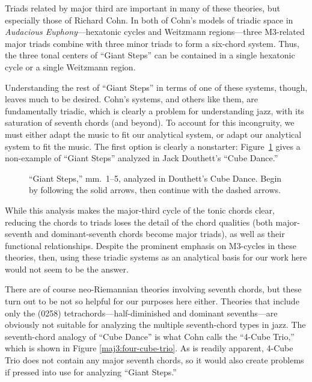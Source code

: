 Triads related by major third are important in many of these theories,
but especially those of Richard Cohn. In both of Cohn's models of triadic
space in \emph{Audacious Euphony}---hexatonic cycles and Weitzmann
regions---three M3-related major triads combine with three minor triads to
form a six-chord system. Thus, the three tonal centers of ``Giant
Steps'' can be contained in a single hexatonic cycle or a single Weitzmann
region.

Understanding the rest of ``Giant Steps'' in terms of one of these systems,
though, leaves much to be desired. Cohn's systems, and others like them, are
fundamentally triadic, which is clearly a problem for understanding jazz, with
its saturation of seventh chords (and beyond). To account for this
incongruity, we must either adapt the music to fit our analytical system, or
adapt our analytical system to fit the music. The first option is clearly a
nonstarter: Figure~\ref{maj3:gs-cube-dance} gives a non-example of ``Giant
Steps'' analyzed in Jack Douthett's ``Cube Dance.''
%
\begin{figure}[tbp]
  \caption[``Giant Steps'' analyzed in Douthett's Cube Dance.]{``Giant
    Steps,'' mm.~1--5, analyzed in Douthett's Cube Dance. Begin by following the
    solid arrows, then continue with the dashed arrows.}
  \label{maj3:gs-cube-dance}
\end{figure}
%
While this analysis makes the major-third cycle of the tonic chords clear,
reducing the chords to triads loses the detail of the chord qualities (both
major-seventh and dominant-seventh chords become major triads), as well as
their functional relationships. Despite the prominent emphasis on M3-cycles in
these theories, then, using these triadic systems as an analytical basis for
our work here would not seem to be the answer.

There are of course neo-Riemannian theories involving seventh chords, but
these turn out to be not so helpful for our purposes here either. Theories
that include only the (0258) tetrachords---half-diminished and dominant
sevenths---are obviously not suitable for analyzing the multiple seventh-chord
types in jazz. The seventh-chord analogy of ``Cube Dance'' is what Cohn calls
the ``4-Cube Trio,'' which is shown in Figure
\ref{maj3:four-cube-trio}. As is readily apparent, 4-Cube Trio
does not contain any major seventh chords, so it would also create problems if
pressed into use for analyzing ``Giant Steps.''

